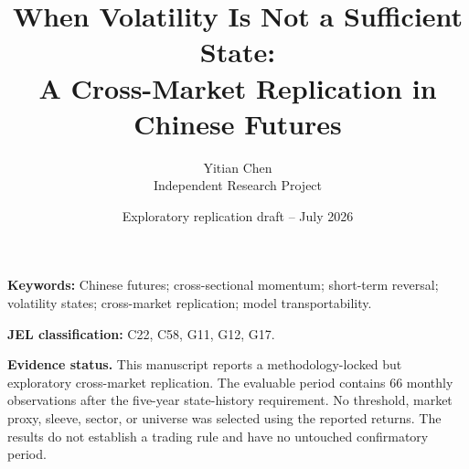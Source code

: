 \documentclass[11pt,a4paper]{article}
\title{When Volatility Is Not a Sufficient State:\\
\large A Cross-Market Replication in Chinese Futures}
\author{Yitian Chen\\
\small Independent Research Project}
\date{Exploratory replication draft -- July 2026}
\begin{document}
\maketitle
\thispagestyle{empty}

\begin{abstract}

\end{abstract}

\vspace{0.7em}
\noindent\textbf{Keywords:} Chinese futures; cross-sectional momentum;
short-term reversal; volatility states; cross-market replication; model transportability.

\vspace{0.4em}
\noindent\textbf{JEL classification:} C22, C58, G11, G12, G17.

\vfill
\begin{evidencebox}
\textbf{Evidence status.} This manuscript reports a methodology-locked but exploratory
cross-market replication. The evaluable period contains 66 monthly observations after
the five-year state-history requirement. No threshold, market proxy, sleeve, sector, or
universe was selected using the reported returns. The results do not establish a trading
rule and have no untouched confirmatory period.
\end{evidencebox}

\clearpage













\clearpage
\appendix

\end{document}
